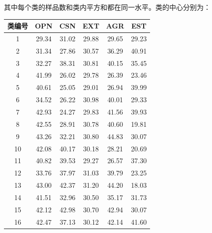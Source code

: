 \documentclass[UTF8]{ctexart}
\begin{document}
\noindent 其中每个类的样品数和类内平方和都在同一水平。类的中心分别为：
\begin{longtable}{c|c|c|c|c|c}
  \hline
  类编号 & OPN   & CSN   & EXT   & AGR   & EST   \\\hline
  1   & 29.34 & 31.02 & 29.88 & 29.65 & 29.23 \\\hline
  2   & 31.34 & 27.86 & 30.57 & 36.29 & 40.91 \\\hline
  3   & 32.27 & 38.31 & 30.81 & 40.15 & 35.45 \\\hline
  4   & 41.99 & 26.02 & 29.78 & 26.39 & 23.46 \\\hline
  5   & 40.61 & 25.05 & 29.01 & 26.94 & 39.99 \\\hline
  6   & 34.52 & 26.22 & 30.98 & 40.01 & 29.33 \\\hline
  7   & 42.93 & 24.27 & 29.83 & 41.56 & 39.93 \\\hline
  8   & 42.55 & 28.91 & 30.78 & 40.60 & 19.81 \\\hline
  9   & 43.26 & 32.21 & 30.80 & 44.83 & 30.07 \\\hline
  10  & 42.08 & 40.17 & 30.18 & 28.21 & 20.69 \\\hline
  11  & 40.82 & 39.53 & 29.27 & 26.57 & 37.30 \\\hline
  12  & 33.76 & 37.97 & 31.03 & 39.79 & 23.25 \\\hline
  13  & 43.00 & 42.37 & 31.20 & 44.20 & 18.03 \\\hline
  14  & 41.51 & 32.96 & 30.50 & 35.17 & 31.73 \\\hline
  15  & 42.12 & 42.98 & 30.70 & 42.94 & 30.07 \\\hline
  16  & 42.47 & 37.13 & 30.12 & 42.14 & 41.60 \\\hline

\end{longtable}
\end{document}
